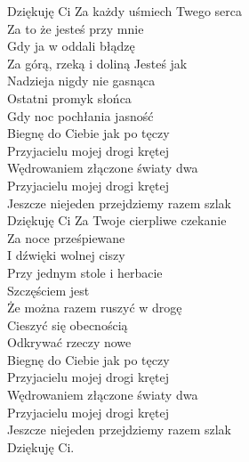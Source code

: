 \begin{text}
    Dziękuję Ci Za każdy uśmiech Twego serca\\
    Za to że jesteś przy mnie\\
    Gdy ja w oddali błądzę\\
    Za górą, rzeką i doliną Jesteś jak\\
    Nadzieja nigdy nie gasnąca\\
    Ostatni promyk słońca\\
    Gdy noc pochłania jasność\\
    Biegnę do Ciebie jak po tęczy\\
    Przyjacielu mojej drogi krętej\\
    Wędrowaniem złączone światy dwa\\
    Przyjacielu mojej drogi krętej\\
    Jeszcze niejeden przejdziemy razem szlak\\
    Dziękuję Ci Za Twoje cierpliwe czekanie\\
    Za noce prześpiewane\\
    I dźwięki wolnej ciszy\\
    Przy jednym stole i herbacie\\
    Szczęściem jest\\
    Że można razem ruszyć w drogę\\
    Cieszyć się obecnością\\
    Odkrywać rzeczy nowe\\
    Biegnę do Ciebie jak po tęczy\\
    Przyjacielu mojej drogi krętej\\
    Wędrowaniem złączone światy dwa\\
    Przyjacielu mojej drogi krętej\\
    Jeszcze niejeden przejdziemy razem szlak\\
    Dziękuję Ci.
\end{text}
\begin{chord}
\end{chord}